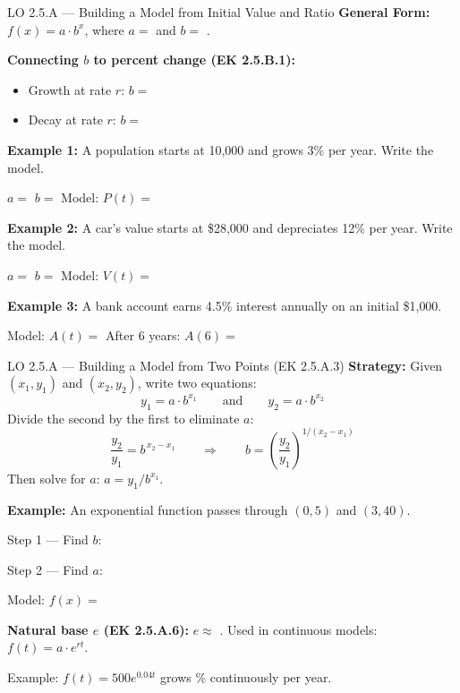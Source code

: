 \documentclass[10pt]{article}
\begin{document}
\vspace{0.06in}

\begin{notesbox}{LO 2.5.A --- Building a Model from Initial Value and Ratio}
\textbf{General Form:} $f(x) = a \cdot b^x$, where $a = $  and $b = $ .

\medskip
\textbf{Connecting $b$ to percent change (EK 2.5.B.1):}
\begin{itemize}[itemsep=3pt]
  \item Growth at rate $r$: $b = $ 
  \item Decay at rate $r$: $b = $ 
\end{itemize}

\medskip
\textbf{Example 1:} A population starts at 10{,}000 and grows 3\% per year. Write the model.

\smallskip
$a = $  \quad $b = $  \quad Model: $P(t) = $ 

\medskip
\textbf{Example 2:} A car's value starts at \$28{,}000 and depreciates 12\% per year. Write the model.

\smallskip
$a = $  \quad $b = $  \quad Model: $V(t) = $ 

\medskip
\textbf{Example 3:} A bank account earns 4.5\% interest annually on an initial \$1{,}000.

\smallskip
Model: $A(t) = $  \quad After 6 years: $A(6) = $ 
\end{notesbox}

\vspace{0.06in}

\begin{notesbox}{LO 2.5.A --- Building a Model from Two Points (EK 2.5.A.3)}
\textbf{Strategy:} Given $(x_1, y_1)$ and $(x_2, y_2)$, write two equations:
\[
  y_1 = a \cdot b^{x_1} \qquad \text{and} \qquad y_2 = a \cdot b^{x_2}
\]
Divide the second by the first to eliminate $a$:
\[
  \frac{y_2}{y_1} = b^{\,x_2 - x_1} \qquad \Rightarrow \qquad b = \left(\frac{y_2}{y_1}\right)^{1/(x_2-x_1)}
\]
Then solve for $a$: $a = y_1 / b^{x_1}$.

\medskip
\textbf{Example:} An exponential function passes through $(0, 5)$ and $(3, 40)$.

\smallskip
Step 1 --- Find $b$: 

\smallskip
Step 2 --- Find $a$: 

\smallskip
Model: $f(x) = $ 

\medskip
\textbf{Natural base $e$ (EK 2.5.A.6):} $e \approx $ . Used in continuous models: $f(t) = a \cdot e^{rt}$.

Example: $f(t) = 500 e^{0.04t}$ grows \% continuously per year.
\end{notesbox}
\end{document}
